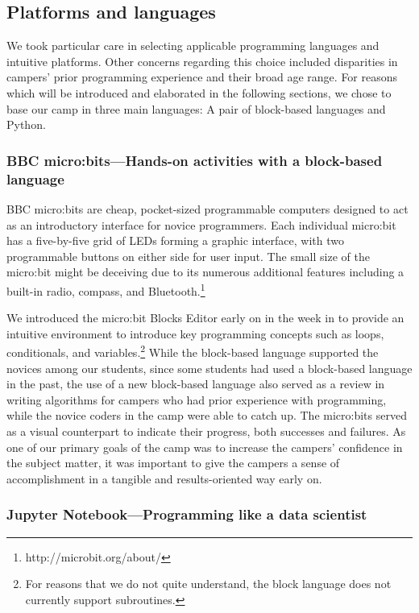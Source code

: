 \subsection{Platforms and languages}

We took particular care in selecting applicable programming languages
and intuitive platforms. Other concerns regarding this choice
included disparities in campers' prior programming experience and
their broad age range. For reasons which will be introduced and
elaborated in the following sections, we chose to base our camp in
three main languages: A pair of block-based languages and Python.

\subsubsection{BBC micro:bits---Hands-on activities with a block-based language}

BBC micro:bits are cheap, pocket-sized programmable computers
designed to act as an introductory interface for novice programmers.
Each individual micro:bit has a five-by-five grid of LEDs forming
a graphic interface, with two programmable buttons on either side
for user input.  The small size of the micro:bit might be deceiving
due to its numerous additional features including a built-in radio,
compass, and Bluetooth.\footnote{http://microbit.org/about/}

We introduced the micro:bit Blocks Editor early on in the week in
to provide an intuitive environment to introduce key programming
concepts such as loops, conditionals, and variables.\footnote{For
reasons that we do not quite understand, the block language does
not currently support subroutines.} While the block-based language
supported the novices among our students, since some students had
used a block-based language in the past, the use of a new block-based
language also served as a review in writing algorithms for campers
who had prior experience with programming, while the novice coders
in the camp were able to catch up. The micro:bits served as a visual
counterpart to indicate their progress, both successes and failures.
As one of our primary goals of the camp was to increase the campers'
confidence in the subject matter, it was important to give the
campers a sense of accomplishment in a tangible and results-oriented
way early on.

\subsubsection{Jupyter Notebook---Programming like a data scientist}


